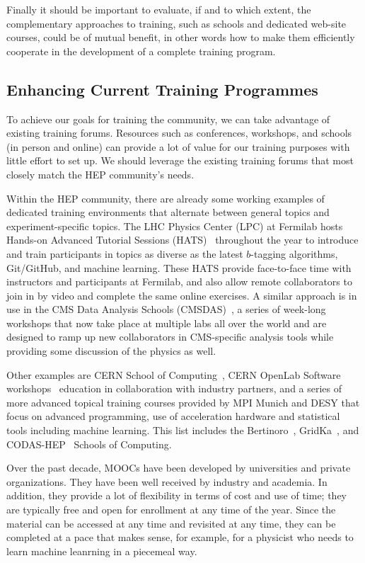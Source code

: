 \documentclass[12pt,a4paper]{article}
\begin{document}
Finally it should be important to evaluate, if and to which extent, the
complementary approaches to training, such as schools and dedicated web-site
courses, could be of mutual benefit, in other words how to make them efficiently cooperate in the
development of a complete training program.


\subsection{Enhancing Current Training Programmes}
\label{sec:ehcurtrainprog}

To achieve our goals for training the community, we can take advantage of
existing training forums. Resources such as conferences, workshops, and schools
(in person and online) can provide a lot of value for our training purposes with
little effort to set up. We should leverage the existing training forums that
most closely match the HEP community's needs.

Within the HEP community, there are already some working examples of dedicated
training environments that alternate between general topics and
experiment-specific topics. The LHC Physics Center (LPC) at Fermilab hosts
Hands-on Advanced Tutorial Sessions
(HATS)~\cite{LPCHandsOn}
throughout the year to introduce and train participants in topics as diverse as
the latest $b$-tagging algorithms, Git/GitHub, and machine learning. These HATS
provide face-to-face time with instructors and participants at Fermilab, and
also allow remote collaborators to join in by video and complete the same online
exercises. A similar approach is in use in the CMS Data Analysis Schools
(CMSDAS)~\cite{LPCDataAnalysis},
a series of week-long workshops that now take place at multiple labs all over
the world and are designed to ramp up new collaborators in CMS-specific analysis
tools while providing some discussion of the physics as well.

Other examples are CERN School of Computing~\cite{CERNSchoolOfComputing},
CERN OpenLab Software workshops~\cite{OPENLab} education in collaboration with
industry partners, and a series of more advanced topical training courses
provided by MPI Munich and DESY that focus on advanced programming, use of
acceleration hardware and statistical tools including machine learning. This
list includes the
Bertinoro~\cite{Bertinoro},
GridKa~\cite{GridKa}, and
CODAS-HEP~\cite{CODAS-HEP} Schools of Computing.

Over the past decade, MOOCs have been developed by universities and private organizations.
They have been well received by industry and academia.
In addition, they provide a lot of flexibility in terms of cost and use of time;
they are typically free and open for enrollment at any time of the
year. Since the material can be accessed at any time and revisited at any time,
they can be completed at a pace that makes sense, for example, for a physicist
who needs to learn machine leanrning in a piecemeal way.
\end{document}

